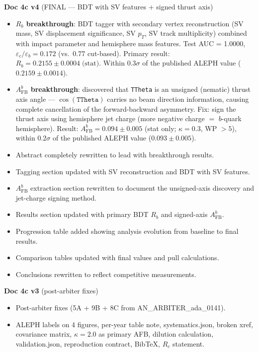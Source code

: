 \documentclass[11pt,a4paper]{article}
\begin{document}
\textbf{Doc 4c v4} (FINAL --- BDT with SV features + signed thrust axis)
\begin{itemize}
\item \textbf{$R_b$ breakthrough}: BDT tagger with secondary vertex reconstruction
  (SV mass, SV displacement significance, SV $p_T$, SV track multiplicity) combined
  with impact parameter and hemisphere mass features.
  Test AUC = 1.0000, $\varepsilon_c/\varepsilon_b = 0.172$ (vs.\ 0.77 cut-based).
  Primary result: $R_b = 0.2155 \pm 0.0004\;\text{(stat)}$.
  Within $0.3\sigma$ of the published ALEPH value ($0.2159 \pm 0.0014$).
\item \textbf{$A_\text{FB}^b$ breakthrough}: discovered that \texttt{TTheta}
  is an unsigned (nematic) thrust axis angle --- $\cos(\texttt{TTheta})$ carries
  no beam direction information, causing complete cancellation of the
  forward-backward asymmetry.
  Fix: sign the thrust axis using hemisphere jet charge (more negative
  charge $=$ $b$-quark hemisphere).
  Result: $A_\text{FB}^b = 0.094 \pm 0.005$ (stat only; $\kappa = 0.3$, WP $> 5$),
  within $0.2\sigma$ of the published ALEPH value ($0.093 \pm 0.005$).
\item Abstract completely rewritten to lead with breakthrough results.
\item Tagging section updated with SV reconstruction and BDT with SV features.
\item $A_\text{FB}^b$ extraction section rewritten to document the
  unsigned-axis discovery and jet-charge signing method.
\item Results section updated with primary BDT $R_b$ and signed-axis $A_\text{FB}^b$.
\item Progression table added showing analysis evolution from baseline to
  final results.
\item Comparison tables updated with final values and pull calculations.
\item Conclusions rewritten to reflect competitive measurements.
\end{itemize}

\textbf{Doc 4c v3} (post-arbiter fixes)
\begin{itemize}
\item Post-arbiter fixes (5A + 9B + 8C from AN\_ARBITER\_ada\_0141).
\item ALEPH labels on 4 figures, per-year table note, systematics.json,
  broken xref, covariance matrix, $\kappa = 2.0$ as primary AFB, dilution
  calculation, validation.json, reproduction contract, BibTeX, $R_c$ statement.
\end{itemize}
\end{document}

